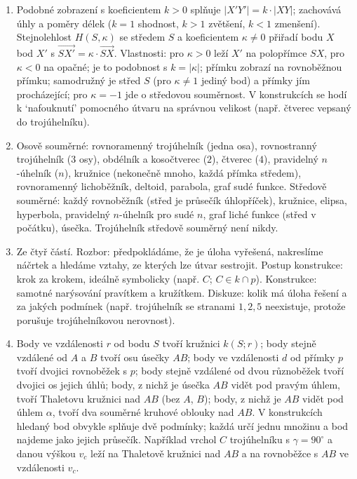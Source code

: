 \begin{enumerate}[label=\textbf{\arabic*.}, leftmargin=*, itemsep=0.8em]
  \item {}
  Podobné zobrazení s koeficientem $k > 0$ splňuje $|X'Y'| = k\cdot|XY|$; zachovává úhly a poměry délek ($k = 1$ shodnost, $k > 1$ zvětšení, $k < 1$ zmenšení). Stejnolehlost $H(S, \kappa)$ se středem $S$ a koeficientem $\kappa\neq 0$ přiřadí bodu $X$ bod $X'$ s $\overrightarrow{SX'} = \kappa\cdot\overrightarrow{SX}$. Vlastnosti: pro $\kappa > 0$ leží $X'$ na polopřímce $SX$, pro $\kappa < 0$ na opačné; je to podobnost s $k = |\kappa|$; přímku zobrazí na rovnoběžnou přímku; samodružný je střed $S$ (pro $\kappa\neq 1$ jediný bod) a přímky jím procházející; pro $\kappa = -1$ jde o středovou souměrnost. V konstrukcích se hodí k `nafouknutí' pomocného útvaru na správnou velikost (např. čtverec vepsaný do trojúhelníku). 

  \item {}
  Osově souměrné: rovnoramenný trojúhelník (jedna osa), rovnostranný trojúhelník ($3$ osy), obdélník a kosočtverec ($2$), čtverec ($4$), pravidelný $n$-úhelník ($n$), kružnice (nekonečně mnoho, každá přímka středem), rovnoramenný lichoběžník, deltoid, parabola, graf sudé funkce. Středově souměrné: každý rovnoběžník (střed je průsečík úhlopříček), kružnice, elipsa, hyperbola, pravidelný $n$-úhelník pro sudé $n$, graf liché funkce (střed v počátku), úsečka. Trojúhelník středově souměrný není nikdy.

  \item {}
  Ze čtyř částí. Rozbor: předpokládáme, že je úloha vyřešená, nakreslíme náčrtek a hledáme vztahy, ze kterých lze útvar sestrojit. Postup konstrukce: krok za krokem, ideálně symbolicky (např. $C$; $C\in k\cap p$). Konstrukce: samotné narýsování pravítkem a kružítkem. Diskuze: kolik má úloha řešení a za jakých podmínek (např. trojúhelník se stranami $1, 2, 5$ neexistuje, protože porušuje trojúhelníkovou nerovnost). 

  \item {}
  Body ve vzdálenosti $r$ od bodu $S$ tvoří kružnici $k(S; r)$; body stejně vzdálené od $A$ a $B$ tvoří osu úsečky $AB$; body ve vzdálenosti $d$ od přímky $p$ tvoří dvojici rovnoběžek s $p$; body stejně vzdálené od dvou různoběžek tvoří dvojici os jejich úhlů; body, z nichž je úsečka $AB$ vidět pod pravým úhlem, tvoří Thaletovu kružnici nad $AB$ (bez $A$, $B$); body, z nichž je $AB$ vidět pod úhlem $\alpha$, tvoří dva souměrné kruhové oblouky nad $AB$. V konstrukcích hledaný bod obvykle splňuje dvě podmínky; každá určí jednu množinu a bod najdeme jako jejich průsečík. Například vrchol $C$ trojúhelníku s $\gamma = 90^\circ$ a danou výškou $v_c$ leží na Thaletově kružnici nad $AB$ a na rovnoběžce s $AB$ ve vzdálenosti $v_c$. 


\end{enumerate}
